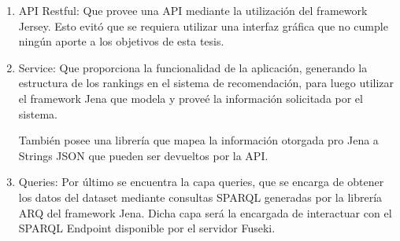 \begin{enumerate}
 \item API Restful: Que provee una API mediante la utilización del framework Jersey. Esto evitó 
 que se requiera utilizar una interfaz gráfica que no cumple ningún aporte a los objetivos de esta tesis.
 \item Service: Que proporciona la funcionalidad de la aplicación, generando la estructura de los 
 rankings en el sistema de recomendación, para luego utilizar el framework Jena que modela y proveé la información 
 solicitada por el sistema. 
 
 También posee una librería que mapea la información otorgada pro Jena a Strings JSON que pueden ser 
 devueltos por la API.
 \item Queries: Por último se encuentra la capa queries, que se encarga de obtener los datos del dataset 
 mediante consultas SPARQL generadas por la librería ARQ del framework Jena. Dicha capa será la encargada 
 de interactuar con el SPARQL Endpoint disponible por el servidor Fuseki.
\end{enumerate}